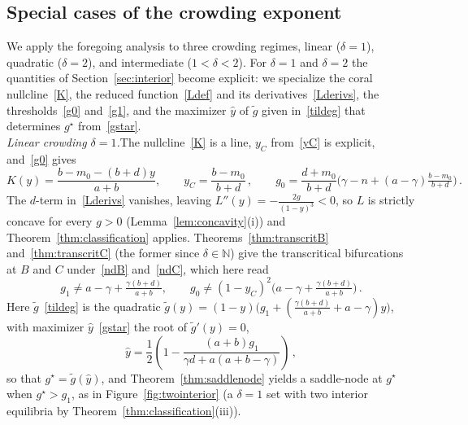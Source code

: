 \documentclass[reqno,11pt]{amsart}
\numberwithin{equation}{section}
\newcommand{\N}{\mathbb{N}}
\begin{document}
\subsection{Special cases of the crowding exponent}\label{sec:examples}
We apply the foregoing analysis to three crowding regimes, linear ($\delta=1$), quadratic ($\delta=2$), and intermediate ($1<\delta<2$). For $\delta=1$ and $\delta=2$ the quantities of Section~\ref{sec:interior} become explicit: we specialize the coral nullcline~\eqref{K}, the reduced function~\eqref{Ldef} and its derivatives~\eqref{Lderivs}, the thresholds~\eqref{g0} and~\eqref{g1}, and the maximizer $\hat y$ of $\tilde g$ given in~\eqref{tildeg} that determines $g^\star$ from~\eqref{gstar}.\\

\noindent\emph{Linear crowding $\delta=1$.}\quad The nullcline~\eqref{K} is a line, $y_C$ from~\eqref{yC} is explicit, and~\eqref{g0} gives
\[
K(y)=\frac{b-m_0-(b+d)y}{a+b},\qquad y_C=\frac{b-m_0}{b+d}\,,\qquad
g_0=\frac{d+m_0}{b+d}\Big(\gamma-n+(a-\gamma)\tfrac{b-m_0}{b+d}\Big)\,.
\]
The $d$-term in~\eqref{Lderivs} vanishes, leaving $L''(y)=-\tfrac{2g}{(1-y)^3}<0$, so $L$ is strictly concave for every $g>0$ (Lemma~\ref{lem:concavity}(i)) and Theorem~\ref{thm:classification} applies. Theorems~\ref{thm:transcritB} and~\ref{thm:transcritC} (the former since $\delta\in\N$) give the transcritical bifurcations at $B$ and $C$ under~\eqref{ndB} and~\eqref{ndC}, which here read
\[
g_1\neq a-\gamma+\tfrac{\gamma(b+d)}{a+b},\qquad
g_0\neq(1-y_C)^2\Big(a-\gamma+\tfrac{\gamma(b+d)}{a+b}\Big)\,.
\]
Here $\tilde g$~\eqref{tildeg} is the quadratic $\tilde g(y)=(1-y)\big(g_1+(\tfrac{\gamma(b+d)}{a+b}+a-\gamma)y\big)$, with maximizer $\hat y$~\eqref{gstar} the root of $\tilde g'(y)=0$,
\[
\hat y=\frac{1}{2}\left(1-\frac{(a+b)g_1}{\gamma d+a(a+b-\gamma)}\right)\,,
\]
so that $g^\star=\tilde g(\hat y)$, and Theorem~\ref{thm:saddlenode} yields a saddle-node at $g^\star$ when $g^\star>g_1$, as in Figure~\ref{fig:twointerior} (a $\delta=1$ set with two interior equilibria by Theorem~\ref{thm:classification}(iii)).\\
\end{document}
